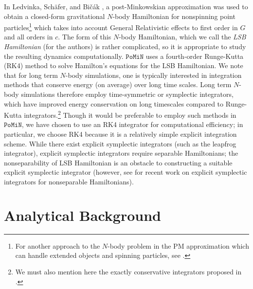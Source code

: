 \documentclass[aps,onecolumn,notitlepage,eqsecnum,nofootinbib,floatfix,superscriptaddress]{revtex4-1}
\newcommand{\codename}{\mathtt{PoMiN}}
\begin{document}
In Ledvinka, Sch{\"a}fer, and Bi{\v c}{\'a}k \cite{PM}, a post-Minkowskian approximation was used to obtain a closed-form gravitational $N$-body Hamiltonian for nonspinning point particles\footnote{For another approach to the $N$-body problem in the PM approximation which can handle extended objects and spinning particles, see \cite{ZschockeSoffel}.} which takes into account General Relativistic effects to first order in $G$ and all orders in $c$. The form of this $N$-body Hamiltonian, which we call the \textit{LSB Hamiltonian} (for the authors) is rather complicated, so it is appropriate to study the resulting dynamics computationally. $\codename$ uses a fourth-order Runge-Kutta (RK4) method to solve Hamilton's equations for the LSB Hamiltonian. We note that for long term $N$-body simulations, one is typically interested in integration methods that conserve energy (on average) over long time scales. Long term $N$-body simulations therefore employ time-symmetric or symplectic integrators, which have improved energy conservation on long timescales compared to Runge-Kutta integrators.\footnote{We must also mention here the exactly conservative integrators proposed in \cite{Shadwicketal1995}.} Though it would be preferable to employ such methods in $\codename$, we have chosen to use an RK4 integrator for computational efficiency; in particular, we choose RK4 because it is a relatively simple explicit integration scheme. While there exist explicit symplectic integrators (such as the leapfrog integrator), explicit symplectic integrators require separable Hamiltonians; the nonseparability of LSB Hamiltonian is an obstacle to constructing a suitable explicit symplectic integrator (however, see \cite{Tao2016} for recent work on explicit symplectic integrators for nonseparable Hamiltonians).

\section{Analytical Background}
%
%
\end{document}
